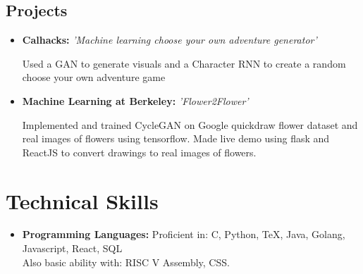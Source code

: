 \documentclass[11pt,letterpaper,sans]{moderncv}        %
\begin{document}
\vspace{2pt}

\subsection{Projects}

\vspace{5pt}

\begin{itemize}

\item{\textbf{Calhacks:} \textit{'Machine learning choose your own adventure generator'}

\vspace{3pt}

\small{Used a GAN to generate visuals and a Character RNN to create a random choose your own adventure game}}
\iffalse
\item{\textbf{Developer Camp Best Education Hack:} \textit{'Splash Game'}

\vspace{3pt}

\small{Used Pixi Library to create a Javascript infinite runner game to teach children about the water cycle and the importance of conservation}}
\fi
\item{\textbf{Machine Learning at Berkeley:} \textit{'Flower2Flower'}

\vspace{3pt}

        \small{Implemented and trained CycleGAN on Google quickdraw flower dataset and real images of flowers using tensorflow. Made live demo using flask and ReactJS to convert drawings to real images of flowers.}}
\end{itemize}

\section{Technical Skills}

\vspace{3pt}

\begin{itemize}

\item \textbf{Programming Languages:} Proficient in: C, Python, TeX, Java, Golang, Javascript, React, SQL \\ Also basic ability with: RISC V Assembly, CSS.

\end{itemize}
\end{document}
